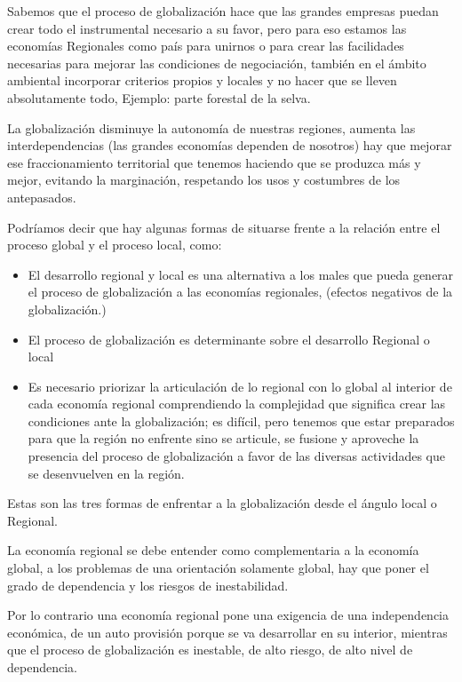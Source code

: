 \documentclass[
  a4paper,
]{article}
\providecommand{\tightlist}{%
  \setlength{\itemsep}{0pt}\setlength{\parskip}{0pt}}\usepackage{longtable,booktabs,array}
\begin{document}
Sabemos que el proceso de globalización hace que las grandes empresas
puedan crear todo el instrumental necesario a su favor, pero para eso
estamos las economías Regionales como país para unirnos o para crear las
facilidades necesarias para mejorar las condiciones de negociación,
también en el ámbito ambiental incorporar criterios propios y locales y
no hacer que se lleven absolutamente todo, Ejemplo: parte forestal de la
selva.

La globalización disminuye la autonomía de nuestras regiones, aumenta
las interdependencias (las grandes economías dependen de nosotros) hay
que mejorar ese fraccionamiento territorial que tenemos haciendo que se
produzca más y mejor, evitando la marginación, respetando los usos y
costumbres de los antepasados.

Podríamos decir que hay algunas formas de situarse frente a la relación
entre el proceso global y el proceso local, como:

\begin{itemize}
\tightlist
\item
  El desarrollo regional y local es una alternativa a los males que
  pueda generar el proceso de globalización a las economías regionales,
  (efectos negativos de la globalización.)
\item
  El proceso de globalización es determinante sobre el desarrollo
  Regional o local
\item
  Es necesario priorizar la articulación de lo regional con lo global al
  interior de cada economía regional comprendiendo la complejidad que
  significa crear las condiciones ante la globalización; es difícil,
  pero tenemos que estar preparados para que la región no enfrente sino
  se articule, se fusione y aproveche la presencia del proceso de
  globalización a favor de las diversas actividades que se desenvuelven
  en la región.
\end{itemize}

Estas son las tres formas de enfrentar a la globalización desde el
ángulo local o Regional.

La economía regional se debe entender como complementaria a la economía
global, a los problemas de una orientación solamente global, hay que
poner el grado de dependencia y los riesgos de inestabilidad.

Por lo contrario una economía regional pone una exigencia de una
independencia económica, de un auto provisión porque se va desarrollar
en su interior, mientras que el proceso de globalización es inestable,
de alto riesgo, de alto nivel de dependencia.
\end{document}

